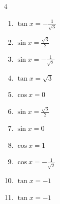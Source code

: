 \begin{multicols}{4}
\begin{enumerate}
  \item $\displaystyle \tan{x}  = -\frac{1}{\sqrt{3}}$


  \item $\displaystyle \sin{x}  = \frac{\sqrt{3}}{2}$


\columnbreak %

  \item $\displaystyle \sin{x}  = -\frac{1}{\sqrt{2}}$


  \item $\displaystyle \tan{x}  = \sqrt{3}$


  \item $\displaystyle \cos{x}  = 0$


  \item $\displaystyle \sin{x}  = \frac{\sqrt{3}}{2}$


  \item $\displaystyle \sin{x}  = 0$

        \phantom{$\displaystyle x = 0 , \pi$}

  \item $\displaystyle \cos{x}  = 1$

        \phantom{$\displaystyle x = 0$}

  \item $\displaystyle \cos{x}  = -\frac{1}{\sqrt{2}}$


  \item $\displaystyle \tan{x}  = -1$


  \item $\displaystyle \tan{x}  = -1$



\end{enumerate}
\end{multicols}
